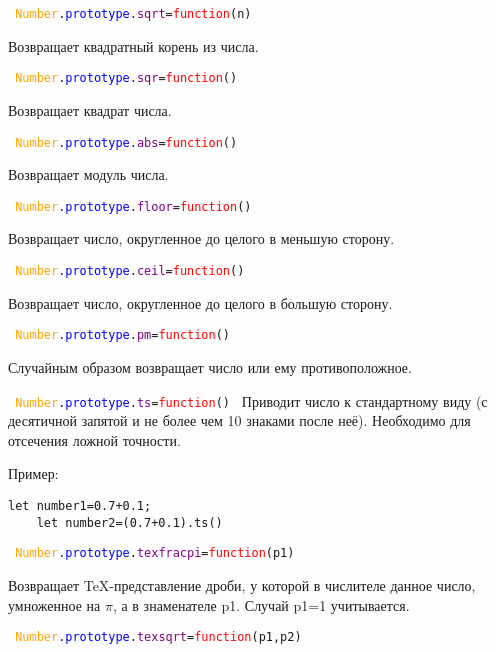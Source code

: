 \texttt{
	\textcolor{Orange}{Number}.\textcolor{Blue}{prototype}.\textcolor{Purple}{sqrt}=\textcolor{Red}{function}(n)
}

Возвращает квадратный корень из числа.

\texttt{
	\textcolor{Orange}{Number}.\textcolor{Blue}{prototype}.\textcolor{Purple}{sqr}=\textcolor{Red}{function}()
}

Возвращает квадрат числа.

\texttt{
	\textcolor{Orange}{Number}.\textcolor{Blue}{prototype}.\textcolor{Purple}{abs}=\textcolor{Red}{function}()
}

Возвращает модуль числа.

\texttt{
	\textcolor{Orange}{Number}.\textcolor{Blue}{prototype}.\textcolor{Purple}{floor}=\textcolor{Red}{function}()
}

Возвращает число, округленное до целого в меньшую сторону.

\texttt{
	\textcolor{Orange}{Number}.\textcolor{Blue}{prototype}.\textcolor{Purple}{ceil}=\textcolor{Red}{function}()
}

Возвращает число, округленное до целого в большую сторону.

\texttt{
	\textcolor{Orange}{Number}.\textcolor{Blue}{prototype}.\textcolor{Purple}{pm}=\textcolor{Red}{function}()
}

Случайным образом возвращает число или ему противоположное.

\texttt{
	\textcolor{Orange}{Number}.\textcolor{Blue}{prototype}.\textcolor{Purple}{ts}=\textcolor{Red}{function}()
}
Приводит число к стандартному виду (с десятичной запятой и не более чем 10 знаками после неё).
Необходимо для отсечения ложной точности.

Пример:%
\begin{lstlisting}[frame=none]
	let number1=0.7+0.1;
	let number2=(0.7+0.1).ts()
\end{lstlisting}

	\vspace{\baselineskip}
\texttt{
	\textcolor{Orange}{Number}.\textcolor{Blue}{prototype}.\textcolor{Purple}{texfracpi}=\textcolor{Red}{function}(p1)
}

Возвращает TeX-представление дроби, у которой в числителе данное число, умноженное на $\pi$, а в знаменателе p1.
Случай p1=1 учитывается.

\texttt{
	\textcolor{Orange}{Number}.\textcolor{Blue}{prototype}.\textcolor{Purple}{texsqrt}=\textcolor{Red}{function}(p1,p2)
}

